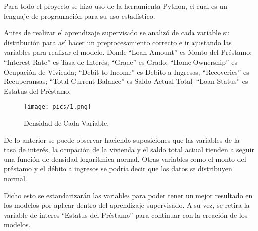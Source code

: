 \documentclass[a4paper,12pt]{article}
\begin{document}
Para todo el proyecto se hizo uso de la herramienta Python, el cual es un lenguaje de programación para su uso estadístico. 

Antes de realizar el aprendizaje supervisado se analizó de cada variable su distribución para así hacer un preprocesamiento correcto e ir ajustando las variables para realizar el modelo. Donde ``Loan Amount'' es Monto del Préstamo; ``Interest Rate'' es Tasa de Interés; ``Grade'' es Grado; ``Home Ownership'' es Ocupación de Vivienda; ``Debit to Income'' es Debito a Ingresos; ``Recoveries'' es Recuperansas; ``Total Current Balance'' es Saldo Actual Total; ``Loan Status'' es Estatus del Préstamo.

\begin{figure}[h]
    \centering
    \caption{Densidad de Cada Variable.}
    \texttt{[image: pics/1.png]}
    \label{fig:1}
\end{figure}

De lo anterior se puede observar haciendo suposiciones que las variables de la tasa de interés, la ocupación de la vivienda y el saldo total actual tienden a seguir una función de densidad logarítmica normal. Otras variables como el monto del préstamo y el débito a ingresos se podría decir que los datos se distribuyen normal.

Dicho esto se estandarizarán las variables para poder tener un mejor resultado en los modelos por aplicar dentro del aprendizaje supervisado. A su vez, se retira la variable de interes ``Estatus del Préstamo'' para continuar con la creación de los modelos.

\begin{table}[h]
    \centering
    \caption{Datos Estandarizados.}
    \label{tab:2}
\end{table}
\end{document}
